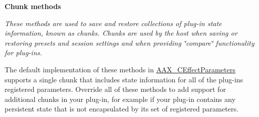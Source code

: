 \begin{Indent}\textbf{ Chunk methods}\par
{\em These methods are used to save and restore collections of plug-\/in state information, known as chunks. Chunks are used by the host when saving or restoring presets and session settings and when providing \char`\"{}compare\char`\"{} functionality for plug-\/ins.

The default implementation of these methods in \mbox{\hyperlink{a01481}{A\+A\+X\+\_\+\+C\+Effect\+Parameters}} supports a single chunk that includes state information for all of the plug-\/in\textquotesingle{}s registered parameters. Override all of these methods to add support for additional chunks in your plug-\/in, for example if your plug-\/in contains any persistent state that is not encapsulated by its set of registered parameters.

}
\end{Indent}
